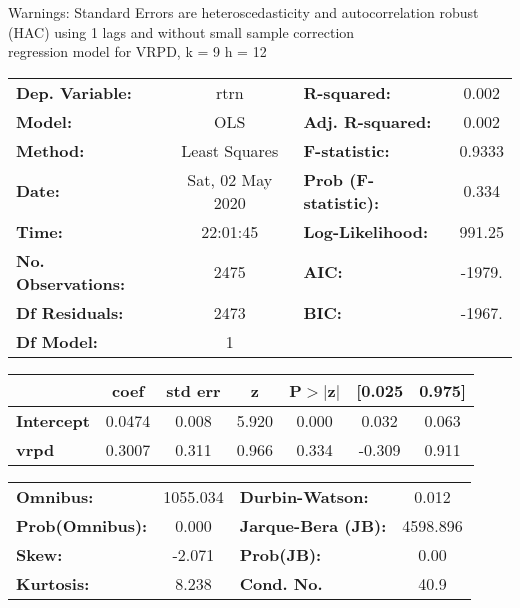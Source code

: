 Warnings: \newline
 [1] Standard Errors are heteroscedasticity and autocorrelation robust (HAC) using 1 lags and without small sample correction\\ 

regression model for VRPD, k = 9 h = 12\begin{center}
\begin{tabular}{lclc}
\toprule
\textbf{Dep. Variable:}    &       rtrn       & \textbf{  R-squared:         } &     0.002   \\
\textbf{Model:}            &       OLS        & \textbf{  Adj. R-squared:    } &     0.002   \\
\textbf{Method:}           &  Least Squares   & \textbf{  F-statistic:       } &    0.9333   \\
\textbf{Date:}             & Sat, 02 May 2020 & \textbf{  Prob (F-statistic):} &    0.334    \\
\textbf{Time:}             &     22:01:45     & \textbf{  Log-Likelihood:    } &    991.25   \\
\textbf{No. Observations:} &        2475      & \textbf{  AIC:               } &    -1979.   \\
\textbf{Df Residuals:}     &        2473      & \textbf{  BIC:               } &    -1967.   \\
\textbf{Df Model:}         &           1      & \textbf{                     } &             \\
\bottomrule
\end{tabular}
\begin{tabular}{lcccccc}
                   & \textbf{coef} & \textbf{std err} & \textbf{z} & \textbf{P$> |$z$|$} & \textbf{[0.025} & \textbf{0.975]}  \\
\midrule
\textbf{Intercept} &       0.0474  &        0.008     &     5.920  &         0.000        &        0.032    &        0.063     \\
\textbf{vrpd}      &       0.3007  &        0.311     &     0.966  &         0.334        &       -0.309    &        0.911     \\
\bottomrule
\end{tabular}
\begin{tabular}{lclc}
\textbf{Omnibus:}       & 1055.034 & \textbf{  Durbin-Watson:     } &    0.012  \\
\textbf{Prob(Omnibus):} &   0.000  & \textbf{  Jarque-Bera (JB):  } & 4598.896  \\
\textbf{Skew:}          &  -2.071  & \textbf{  Prob(JB):          } &     0.00  \\
\textbf{Kurtosis:}      &   8.238  & \textbf{  Cond. No.          } &     40.9  \\
\bottomrule
\end{tabular}
\end{center}

